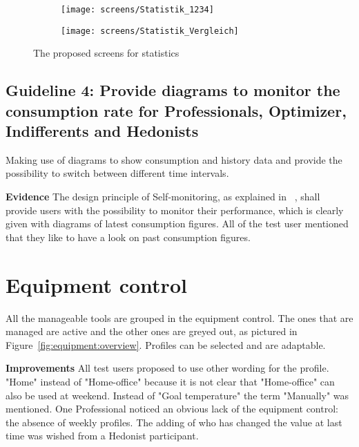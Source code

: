 \begin{figure}[h]
	\centering
	\begin{subfigure}[b]{0.24\columnwidth}
		\centering
		\texttt{[image: screens/Statistik\_1234]}
		\label{fig:statistik:ohnevergleich}
	\end{subfigure}
	\begin{subfigure}[b]{0.24\columnwidth}
		\centering
		\texttt{[image: screens/Statistik\_Vergleich]}
		\label{fig:statistik:mitvergleich}
	\end{subfigure}
	\caption{The proposed screens for statistics}
	\label{fig:statistik} %
\end{figure}

\subsection*{Guideline 4: Provide diagrams to monitor the consumption rate for Professionals, Optimizer, Indifferents and Hedonists}

Making use of diagrams to show consumption and history data and provide the possibility to switch between different time intervals.

\textbf{Evidence} \quad The design principle of Self-monitoring, as explained in ~, shall provide users with the possibility to monitor their performance, which is clearly given with diagrams of latest consumption figures. All of the test user mentioned that they like to have a look on past consumption figures.

\section{Equipment control}

All the manageable tools are grouped in the equipment control. The ones that are managed are active and the other ones are greyed out, as pictured in Figure~\ref{fig:equipment:overview}. Profiles can be selected and are adaptable.

\textbf{Improvements} \quad All test users proposed to use other wording for the profile. "Home" instead of "Home-office" because it is not clear that "Home-office" can also be used at weekend. Instead of "Goal temperature" the term "Manually" was mentioned. One Professional noticed an obvious lack of the equipment control: the absence of weekly profiles. The adding of who has changed the value at last time was wished from a Hedonist participant.

